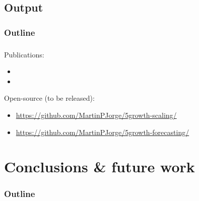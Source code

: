 \documentclass[aspectratio=169]{beamer}
\begin{document}
\subsection{Output}
\begin{frame}
    \frametitle{Outline}
    \tableofcontents[subsectionstyle=show/shaded/hide,sectionstyle=show/shaded]
\end{frame}

\begin{frame}
    \frametitle{\secname}
    \framesubtitle{\subsecname}
    Publications:
    \begin{itemize}
        \item {}
        \item {}
    \end{itemize}

    Open-source (to be released):
    \begin{itemize}
        \item \url{https://github.com/MartinPJorge/5growth-scaling/}
        \item \url{https://github.com/MartinPJorge/5growth-forecasting/}
    \end{itemize}
\end{frame}



\section{Conclusions \& future work}
\begin{frame}
    \frametitle{Outline}
    \tableofcontents[subsectionstyle=show/shaded/hide,sectionstyle=show/shaded]
\end{frame}

\end{document}
